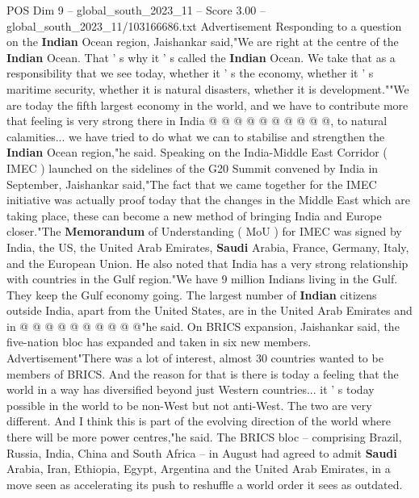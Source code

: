 \begin{textsample}{POS Dim 9 – global\_south\_2023\_11 – Score 3.00 – global\_south\_2023\_11/103166686.txt}
Advertisement Responding to a question on the \textbf{Indian} Ocean region, Jaishankar said,"We are right at the centre of the \textbf{Indian} Ocean.
That ' s why it ' s called the \textbf{Indian} Ocean.
We take that as a responsibility that we see today, whether it ' s the economy, whether it ' s maritime security, whether it is natural disasters, whether it is development.""We are today the fifth largest economy in the world, and we have to contribute more that feeling is very strong there in India @ @ @ @ @ @ @ @ @ @, to natural calamities... we have tried to do what we can to stabilise and strengthen the \textbf{Indian} Ocean region,"he said.
Speaking on the India-Middle East Corridor ( IMEC ) launched on the sidelines of the G20 Summit convened by India in September, Jaishankar said,"The fact that we came together for the IMEC initiative was actually proof today that the changes in the Middle East which are taking place, these can become a new method of bringing India and Europe closer."The \textbf{Memorandum} of Understanding ( MoU ) for IMEC was signed by India, the US, the United Arab Emirates, \textbf{Saudi} Arabia, France, Germany, Italy, and the European Union.
He also noted that India has a very strong relationship with countries in the Gulf region."We have 9 million Indians living in the Gulf.
They keep the Gulf economy going.
The largest number of \textbf{Indian} citizens outside India, apart from the United States, are in the United Arab Emirates and in @ @ @ @ @ @ @ @ @ @"he said.
On BRICS expansion, Jaishankar said, the five-nation bloc has expanded and taken in six new members.
Advertisement"There was a lot of interest, almost 30 countries wanted to be members of BRICS.
And the reason for that is there is today a feeling that the world in a way has diversified beyond just Western countries... it ' s today possible in the world to be non-West but not anti-West.
The two are very different.
And I think this is part of the evolving direction of the world where there will be more power centres,"he said.
The BRICS bloc -- comprising Brazil, Russia, India, China and South Africa -- in August had agreed to admit \textbf{Saudi} Arabia, Iran, Ethiopia, Egypt, Argentina and the United Arab Emirates, in a move seen as accelerating its push to reshuffle a world order it sees as outdated.

\end{textsample}
